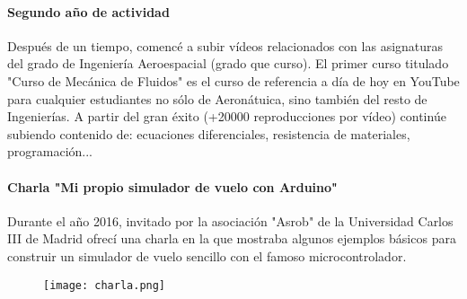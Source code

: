 \paragraph{Segundo año de actividad}

Después de un tiempo, comencé a subir vídeos relacionados con las asignaturas del grado de Ingeniería Aeroespacial (grado que curso). El primer curso titulado "Curso de Mecánica de Fluidos" es el curso de referencia a día de hoy en YouTube para cualquier estudiantes no sólo de Aeronátuica, sino también del resto de Ingenierías. A partir del gran éxito (+20000 reproducciones por vídeo) continúe subiendo contenido de: ecuaciones diferenciales, resistencia de materiales, programación...

\paragraph{Charla "Mi propio simulador de vuelo con Arduino"}

Durante el año 2016, invitado por la asociación "Asrob" de la Universidad Carlos III de Madrid ofrecí una charla en la que mostraba algunos ejemplos básicos para construir un simulador de vuelo sencillo con el famoso microcontrolador.

\begin{figure}[h]
	\centering
	\texttt{[image: charla.png]}
\end{figure}



